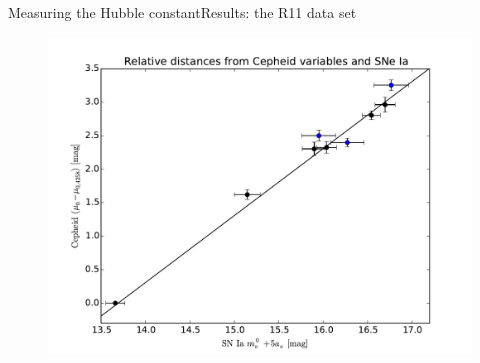 \documentclass{beamer}
\begin{document}
\begin{frame}{Measuring the Hubble constant}{Results: the R11 data set}
{\begin{figure}
\includegraphics[scale=0.4]{../figures/chapter-h0/effective_HP_SNIa.pdf} 
\end{figure}}



\end{frame}
\end{document}
